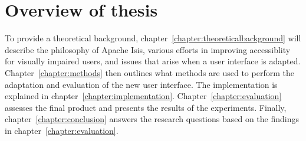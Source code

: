  \label{RQ3}

\section{Overview of thesis}
\label{section:overviewofthesis}
To provide a theoretical background, chapter~\ref{chapter:theoreticalbackground} will describe the philosophy of Apache Isis, various efforts in improving accessiblity for visually impaired users, and issues that arise when a user interface is adapted. Chapter~\ref{chapter:methods} then outlines what methods are used to perform the adaptation and evaluation of the new user interface. The implementation is explained in chapter~\ref{chapter:implementation}. Chapter~\ref{chapter:evaluation} assesses the final product and presents the results of the experiments. Finally, chapter~\ref{chapter:conclusion} answers the research questions based on the findings in chapter~\ref{chapter:evaluation}.